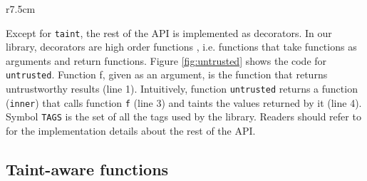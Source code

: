 \documentclass[oribibl]{llncs}
\newcommand{\nameTklass}{Taint-aware }
\begin{document}
\begin{wrapfigure}{r}{7.5cm}
\vspace{-30pt} 
{\small{

\caption{\label{fig:untrusted} Code for \texttt{untrusted}}
\vspace{-10pt}
}}
\vspace{-10pt}
\end{wrapfigure}
Except for \texttt{taint}, the rest of 
the API is implemented as decorators. In our library, 
decorators are high 
order functions \cite{IntroductionFunctional}, 
i.e. functions that take functions as arguments and return functions.
Figure \ref{fig:untrusted} shows the code for \texttt{untrusted}.
Function f, given as an argument, 
is the function that returns 
untrustworthy results (line 1). 
Intuitively, 
function \texttt{untrusted} returns
a function (\texttt{inner}) that 
calls function \texttt{f} (line 3) and taints the values 
returned by it (line 4). Symbol \texttt{TAGS} is the set of 
all the tags used by the library. 
Readers should refer to \cite{PythonLib} 
for the implementation details about the rest of the 
API.










\subsection{\nameTklass functions} 
\end{document}
